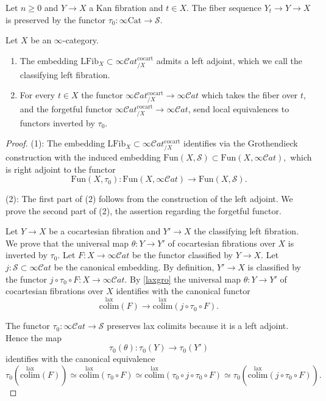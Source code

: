 \documentclass[10pt,oneside]{article}
\numberwithin{equation}{section} %
\numberwithin{figure}{section} %
\theoremstyle{plain}
\theoremstyle{definition}
\newcommand{\mS}{{\mathcal S}}
\newcommand{\bj}{{j}}
\newcommand{\colim}{\mathrm{colim}}
\newcommand{\Cat}{\mathrm{Cat}}
\newcommand{\Fun}{\mathrm{Fun}}
\newcommand{\cocart}{{\mathrm{cocart}}}
\newcommand{\lax}{{\mathrm{lax}}}
\newcommand{\scat}{\mathcal{C}\mathit{at}}
\newcommand{\LFib}{\mathrm{LFib}}
\begin{document}
\begin{corollary}\label{Kanfi}
Let $n\geq 0$ and $Y \to X$ a Kan fibration and $t \in X.$
The fiber sequence $Y_t \to Y \to X$ is preserved by the functor
$\tau_0: \infty\Cat \to \mS.$
    
\end{corollary}


\begin{lemma}\label{clafib} Let $X$ be an $\infty$-category.

\begin{enumerate}[\normalfont(1)]\setlength{\itemsep}{-2pt}
\item The embedding $ \LFib_{X} \subset \infty\scat^{\cocart}_{/X}  $
admits a left adjoint, which we call the classifying left fibration.

\item For every $t \in X$ the functor
$\infty\scat_{/X}^\cocart  \to \infty\scat$ which takes the fiber over $t$,
and the forgetful functor $\infty\scat_{/X}^\cocart  \to \infty\scat$, 
send local equivalences to functors inverted by $\tau_0.$

\end{enumerate}
\end{lemma}

\begin{proof}
(1): The embedding $ \LFib_{X} \subset \infty\scat^{\cocart}_{/X} $ identifies via the Grothendieck construction with the induced embedding
$ \Fun(X,\mS) \subset \Fun(X,\infty\scat),$
which is right adjoint to the functor
$$\Fun(X,\tau_0): \Fun(X,\infty\scat) \to \Fun(X,\mS).$$

(2): The first part of (2) follows from the construction of the left adjoint. We prove the second part of (2), the assertion regarding the forgetful functor.

Let $Y \to X$ be a cocartesian fibration and $Y' \to X$ the classifying left fibration. We prove that the universal map $\theta: Y \to Y' $
of cocartesian fibrations over $X$ is inverted by $\tau_0.$
Let $F: X \to \infty\scat$ be the functor classified by $Y \to X$.
Let $\bj: \mS \subset \infty\scat$ be the canonical embedding.
By definition, $Y' \to X$ is classified by the functor
$ \bj \circ \tau_0 \circ F: X \to \infty\scat. $
By \cref{laxgro} the universal map $\theta: Y \to Y' $
of cocartesian fibrations over $X$ identifies with the canonical functor
$$ \overset{\lax}{\colim}(F) \to \overset{\lax}{\colim}(\bj \circ \tau_0 \circ F).$$

The functor $\tau_0: \infty\scat \to \mS$ preserves lax colimits because it is a left adjoint. Hence the map $$\tau_0(\theta): \tau_0(Y) \to \tau_0(Y') $$ identifies with the canonical equivalence
$$ \tau_0(\overset{\lax}{\colim}(F)) \simeq \overset{\lax}{\colim}(\tau_0 \circ F) \simeq \overset{\lax}{\colim}(\tau_0 \circ \bj \circ \tau_0 \circ F) \simeq \tau_0(\overset{\lax}{\colim}(\bj \circ \tau_0 \circ F)). $$
\end{proof}
\end{document}
